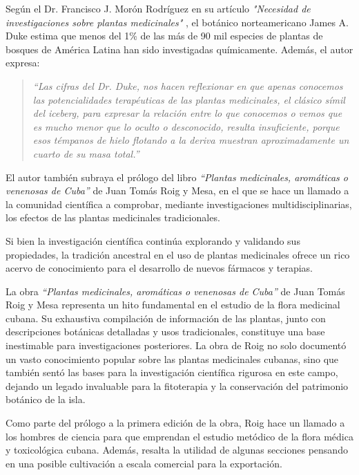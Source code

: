 Según el Dr. Francisco J. Morón Rodríguez en su artículo 
\textit{"Necesidad de investigaciones sobre plantas medicinales"} \cite{Moron2007}, 
el botánico norteamericano James A. Duke estima que menos del 1\% de las más de 90 mil especies 
de plantas de bosques de América Latina han sido investigadas químicamente. Además, el autor expresa:

\begin{quote}
    \textit{``Las cifras del Dr. Duke, nos hacen reflexionar  en que
    apenas conocemos las potencialidades terapéuticas de las plantas
    medicinales, el clásico símil del iceberg, para expresar la relación entre
    lo que conocemos o vemos que es mucho menor que lo oculto o desconocido,
    resulta insuficiente, porque esos témpanos de hielo flotando a la deriva
    muestran aproximadamente un cuarto de su masa total.''}
\end{quote}

El autor también subraya el prólogo del libro \textit{``Plantas medicinales, aromáticas o venenosas de Cuba''} \cite{Roig1945}
de Juan Tomás Roig y Mesa, en el que se hace un llamado a la comunidad científica a comprobar, 
mediante investigaciones multidisciplinarias, los efectos de las plantas medicinales tradicionales.

Si bien la investigación científica continúa explorando y validando sus propiedades, 
la tradición ancestral en el uso de plantas medicinales ofrece un rico acervo de conocimiento 
para el desarrollo de nuevos fármacos y terapias.

La obra \textit{``Plantas medicinales, aromáticas o venenosas de Cuba''} \cite{Roig1945} de Juan Tomás Roig y Mesa 
representa un hito fundamental en el estudio de la flora medicinal cubana. 
Su exhaustiva compilación de información de las plantas, junto con descripciones botánicas 
detalladas y usos tradicionales, constituye una base inestimable para investigaciones 
posteriores. La obra de Roig no solo documentó un vasto conocimiento popular sobre las plantas medicinales cubanas, sino que 
también sentó las bases para la investigación científica rigurosa en este campo, dejando un legado invaluable para la 
fitoterapia y la conservación del patrimonio botánico de la isla.

Como parte del prólogo a la primera edición de la obra, Roig hace un llamado a los hombres 
de ciencia para que emprendan el estudio metódico de la flora médica y toxicológica cubana. 
Además, resalta la utilidad de algunas secciones pensando en una posible cultivación a escala 
comercial para la exportación.

